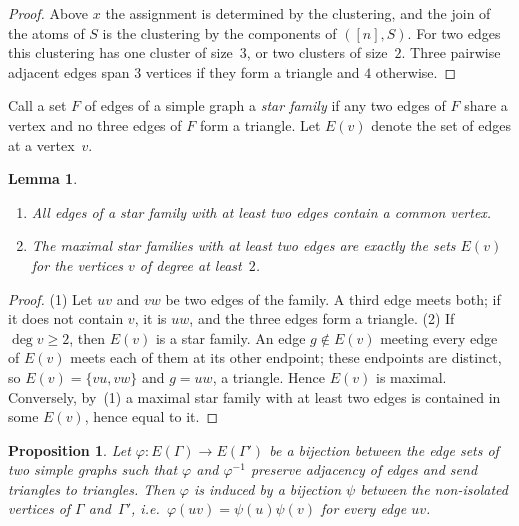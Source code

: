\documentclass[11pt,a4paper]{article}
\numberwithin{equation}{section}
\theoremstyle{plain}
\newtheorem{lemma}[theorem]{Lemma}
\newtheorem{proposition}[theorem]{Proposition}
\theoremstyle{definition}
\theoremstyle{remark}
\begin{document}
\begin{proof}
Above $x$ the assignment is determined by the clustering, and the join of the atoms of $S$ is the clustering by the components of $([n],S)$. For two edges this clustering has one cluster of size~$3$, or two clusters of size~$2$. Three pairwise adjacent edges span $3$ vertices if they form a triangle and $4$ otherwise.
\end{proof}

Call a set $F$ of edges of a simple graph a \emph{star family} if any two edges of $F$ share a vertex and no three edges of $F$ form a triangle. Let $E(v)$ denote the set of edges at a vertex~$v$.

\begin{lemma}\label{lem:stars}
\begin{enumerate}[nosep,label=(\arabic*)]
\item All edges of a star family with at least two edges contain a common vertex.
\item The maximal star families with at least two edges are exactly the sets $E(v)$ for the vertices $v$ of degree at least~$2$.
\end{enumerate}
\end{lemma}

\begin{proof}
(1) Let $uv$ and $vw$ be two edges of the family. A third edge meets both; if it does not contain $v$, it is $uw$, and the three edges form a triangle. (2) If $\deg v\geqslant2$, then $E(v)$ is a star family. An edge $g\notin E(v)$ meeting every edge of $E(v)$ meets each of them at its other endpoint; these endpoints are distinct, so $E(v)=\{vu,vw\}$ and $g=uw$, a triangle. Hence $E(v)$ is maximal. Conversely, by~(1) a maximal star family with at least two edges is contained in some $E(v)$, hence equal to it.
\end{proof}

\begin{proposition}\label{prop:edge-iso}
Let $\varphi\colon E(\Gamma)\to E(\Gamma')$ be a bijection between the edge sets of two simple graphs such that $\varphi$ and $\varphi^{-1}$ preserve adjacency of edges and send triangles to triangles. Then $\varphi$ is induced by a bijection $\psi$ between the non-isolated vertices of $\Gamma$ and~$\Gamma'$, i.e.\ $\varphi(uv)=\psi(u)\psi(v)$ for every edge $uv$.
\end{proposition}
\end{document}
